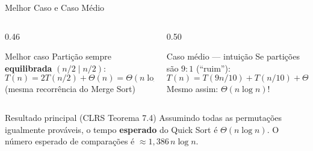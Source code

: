 \documentclass[aspectratio=169]{beamer}
\begin{document}
\begin{frame}[shrink=5]{Melhor Caso e Caso Médio}
  \begin{columns}[T]
    \begin{column}{0.46\textwidth}
      \begin{block}{Melhor caso}
        Partição sempre \textbf{equilibrada} $(n/2 \mid n/2)$:
        \[
          T(n) = 2T(n/2) + \Theta(n) = \Theta(n \log n)
        \]
        (mesma recorrência do Merge Sort)
      \end{block}
    \end{column}
    \begin{column}{0.50\textwidth}
      \begin{block}{Caso médio — intuição}
        Se partições são $9:1$ (``ruim''):
        \[
          T(n) = T(9n/10) + T(n/10) + \Theta(n)
        \]
        Mesmo assim: $\Theta(n \log n)$!
      \end{block}
    \end{column}
  \end{columns}

  \vspace{8pt}
  \begin{exampleblock}{Resultado principal (CLRS Teorema 7.4)}
    Assumindo todas as permutações igualmente prováveis,
    o tempo \textbf{esperado} do Quick Sort é $\Theta(n \log n)$.
    O número esperado de comparações é $\approx 1{,}386\,n \log n$.
  \end{exampleblock}
\end{frame}
\end{document}
